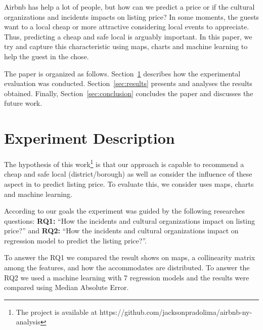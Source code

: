 \documentclass[sigconf]{acmart}
\begin{document}

Airbnb has help a lot of people, but how can we predict a price or if the cultural organizations and incidents impacts on listing price? In some moments, the guests want to a local cheap or more attractive considering local events to appreciate. Thus, predicting a cheap and safe local is arguably important. In this paper, we try and capture this characteristic using maps, charts and machine learning to help the guest in the chose.

The paper is organized as follows. Section~\ref{sec:experiment_description} describes how the experimental evaluation was conducted. Section~\ref{sec:results} presents and analyses the results obtained. Finally, Section~\ref{sec:conclusion} concludes the paper and discusses the future work.

\section{Experiment Description}
\label{sec:experiment_description}

The hypothesis of this work\footnote{The project is available at https://github.com/jacksonpradolima/airbnb-ny-analysis} is that our approach is capable to recommend a cheap and safe local (district/borough) as well as consider the influence of these aspect in to predict listing price. To evaluate this, we consider uses maps, charts and machine learning.

According to our goals the experiment was guided by the following researches questions: \textbf{RQ1:} ``How the incidents and cultural organizations impact on listing price?'' and \textbf{RQ2:} ``How the incidents and cultural organizations impact on regression model to predict the listing price?''.

To answer the RQ1 we compared the result shows on maps, a collinearity matrix among the features, and how the accommodates are distributed. To answer the RQ2 we used a machine learning with 7 regression models and the results were compared using Median Absolute Error.
\end{document}
